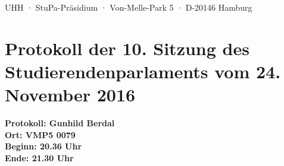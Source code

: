\documentclass[ngerman,headheight=70pt]{scrartcl}
\begin{document}
    UHH · StuPa-Präsidium · Von-Melle-Park 5 · D-20146 Hamburg

    \section*{Protokoll der 10. Sitzung des Studierendenparlaments vom 24. November 2016}

    \textbf{Protokoll: Gunhild Berdal}\\
    \textbf{Ort: VMP5 0079}\\
    \textbf{Beginn: 20.36 Uhr}\\
    \textbf{Ende: 21.30 Uhr}

    \vspace{0.5cm}
\end{document}
